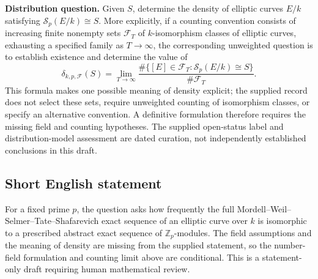 \documentclass[11pt]{article}
\newcommand{\Z}{\mathbb{Z}}
\begin{document}
\textbf{Distribution question.} Given \(S\), determine the density of elliptic curves \(E/k\) satisfying \(\mathcal S_p(E/k)\cong S\). More explicitly, if a counting convention consists of increasing finite nonempty sets \(\mathcal F_T\) of \(k\)-isomorphism classes of elliptic curves, exhausting a specified family as \(T\to\infty\), the corresponding unweighted question is to establish existence and determine the value of
\[
\delta_{k,p,\mathcal F}(S)
=\lim_{T\to\infty}
\frac{\#\{[E]\in\mathcal F_T:\mathcal S_p(E/k)\cong S\}}
{\#\mathcal F_T}.
\]
This formula makes one possible meaning of density explicit; the supplied record does not select these sets, require unweighted counting of isomorphism classes, or specify an alternative convention. A definitive formulation therefore requires the missing field and counting hypotheses. The supplied open-status label and distribution-model assessment are dated curation, not independently established conclusions in this draft.
\subsection{Short English statement}
For a fixed prime \(p\), the question asks how frequently the full Mordell--Weil--Selmer--Tate--Shafarevich exact sequence of an elliptic curve over \(k\) is isomorphic to a prescribed abstract exact sequence of \(\Z_p\)-modules. The field assumptions and the meaning of density are missing from the supplied statement, so the number-field formulation and counting limit above are conditional. This is a statement-only draft requiring human mathematical review.
\end{document}
